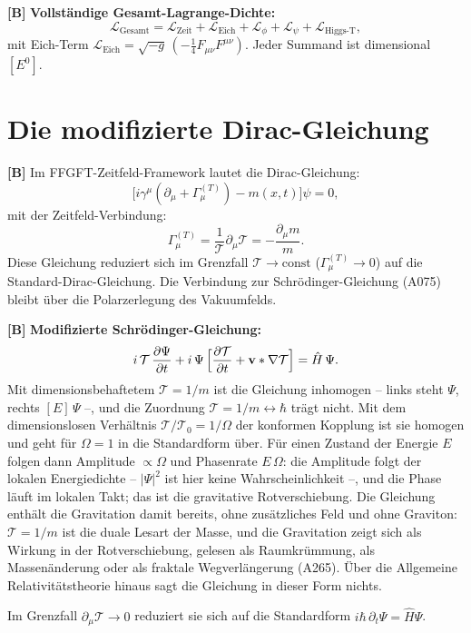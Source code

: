 \textbf{[B]} \textbf{Vollständige Gesamt-Lagrange-Dichte:}
\[
  \mathcal L_\text{Gesamt}
  = \mathcal L_\text{Zeit}
  + \mathcal L_\text{Eich}
  + \mathcal L_\phi
  + \mathcal L_\psi
  + \mathcal L_{\text{Higgs-T}},
\]
mit Eich-Term $\mathcal L_\text{Eich}=\sqrt{-g}\,(-\tfrac14 F_{\mu\nu}F^{\mu\nu})$.
Jeder Summand ist dimensional $[E^0]$.

\section{Die modifizierte Dirac-Gleichung}

\textbf{[B]} Im FFGFT-Zeitfeld-Framework lautet die Dirac-Gleichung:
\[
  \bigl[i\gamma^\mu(\partial_\mu+\Gamma_\mu^{(T)})-m(x,t)\bigr]\psi=0,
\]
mit der Zeitfeld-Verbindung:
\[
  \Gamma_\mu^{(T)}
  = \frac{1}{\mathcal T}\partial_\mu\mathcal T
  = -\frac{\partial_\mu m}{m}.
\]
Diese Gleichung reduziert sich im Grenzfall $\mathcal T\to\text{const}$
($\Gamma_\mu^{(T)}\to0$) auf die Standard-Dirac-Gleichung. Die Verbindung zur
Schrödinger-Gleichung (A075) bleibt über die Polarzerlegung des Vakuumfelds.

\textbf{[B]} \textbf{Modifizierte Schrödinger-Gleichung:}
\[
  i\,\mathcal T\,\frac{\partial\Psi}{\partial t}
  + i\,\Psi\,\Bigl[\frac{\partial\mathcal T}{\partial t}
  + \mathbf v\cdot\nabla\mathcal T\Bigr]
  = \hat H\,\Psi.
\]
Mit dimensionsbehaftetem $\mathcal T=1/m$ ist die Gleichung inhomogen -- links steht $\Psi$, rechts $[E]\,\Psi$ --, und die Zuordnung $\mathcal T=1/m\leftrightarrow\hbar$ trägt nicht. Mit dem dimensionslosen Verhältnis $\mathcal T/\mathcal T_0=1/\Omega$ der konformen Kopplung ist sie homogen und geht für $\Omega=1$ in die Standardform über. Für einen Zustand der Energie $E$ folgen dann Amplitude $\propto\Omega$ und Phasenrate $E\,\Omega$: die Amplitude folgt der lokalen Energiedichte -- $|\Psi|^2$ ist hier keine Wahrscheinlichkeit --, und die Phase läuft im lokalen Takt; das ist die gravitative Rotverschiebung. Die Gleichung enthält die Gravitation damit bereits, ohne zusätzliches Feld und ohne Graviton: $\mathcal T=1/m$ ist die duale Lesart der Masse, und die Gravitation zeigt sich als Wirkung in der Rotverschiebung, gelesen als Raumkrümmung, als Massenänderung oder als fraktale Wegverlängerung (A265). Über die Allgemeine Relativitätstheorie hinaus sagt die Gleichung in dieser Form nichts.

Im Grenzfall $\partial_\mu\mathcal T\to0$ reduziert sie sich auf die
Standardform $i\hbar\,\partial_t\Psi=\hat H\Psi$.


